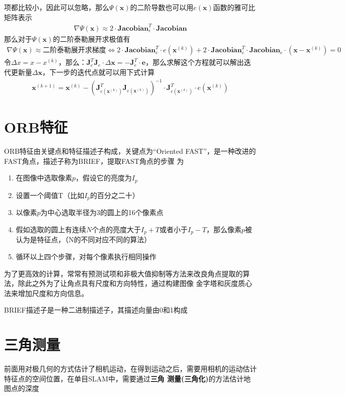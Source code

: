 \documentclass[10pt]{article}
\begin{document}
项都比较小，因此可以忽略，那么$\Psi(\mathbf{x})$的二阶导数也可以用$e(\mathbf{x})$函数的雅可比矩阵表示
\begin{align} 
    \nabla\Psi(\mathbf{x})\approx 2\cdot\mathbf{Jacobian}_{e}^{T}\cdot\mathbf{Jacobian}
\end{align}
那么对于$\Psi(\mathbf{x})$的二阶泰勒展开求极值有
\begin{align} 
    \nabla\Psi(\mathbf{x})\approx\text{二阶泰勒展开求梯度}\Leftrightarrow
    2\cdot\mathbf{Jacobian}_{e}^{T}\cdot e(\mathbf{x}^{(k)})+2\cdot\mathbf{Jacobian}_{e}^{T}
    \cdot\mathbf{Jacobian}_{e}\cdot(\mathbf{x}-\mathbf{x}^{(k)})=0
\end{align}
令$\Delta x=x-x^{(k)}$，那么：$\mathbf{J}_{e}^{T}\mathbf{J}_{e}\cdot\Delta\mathbf{x}=-\mathbf{J}_{e}^{T}
\cdot\mathbf{e}$，那么求解这个方程就可以解出迭代更新量$\Delta\mathbf{x}$，下一步的迭代点就可以用下式计算
\begin{align} 
    \mathbf{x}^{(k+1)}=\mathbf{x}^{(k)}-(\mathbf{J}_{e(\mathbf{x}^{(k)})}^{T}\mathbf{J}_{e(\mathbf{x}^{(k)})}
    )^{-1}\cdot\mathbf{J}_{e(\mathbf{x}^{(k)})}^{T}\cdot e(\mathbf{x}^{(k)})
\end{align}

\section{ORB特征}
ORB特征由关键点和特征描述子构成，关键点为“Oriented FAST”，是一种改进的FAST角点，描述子称为BRIEF，提取FAST角点的步骤
为
\begin{enumerate}
    \item 在图像中选取像素$p$，假设它的亮度为$I_p$
    \item 设置一个阈值T（比如$I_p$的百分之二十）
    \item 以像素$p$为中心选取半径为3的圆上的16个像素点
    \item 假如选取的圆上有连续$N$个点的亮度大于$I_p+T$或者小于$I_p-T$，那么像素$p$被认为是特征点，（N的不同对应不同的算法）
    \item 循环以上四个步骤，对每个像素执行相同操作
\end{enumerate}
为了更高效的计算，常常有预测试项和非极大值抑制等方法来改良角点提取的算法，除此之外为了让角点具有尺度和方向特性，通过构建图像
金字塔和灰度质心法来增加尺度和方向信息。

BRIEF描述子是一种二进制描述子，其描述向量由0和1构成

\section{三角测量}
前面用对极几何的方式估计了相机运动，在得到运动之后，需要用相机的运动估计特征点的空间位置，在单目SLAM中，需要通过\textbf{三角
测量(三角化)}的方法估计地图点的深度
\end{document}
